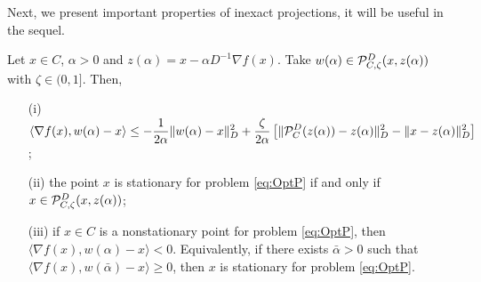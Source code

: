 Next, we present  important properties of  inexact projections,  it  will be useful in  the sequel.
\begin{lemma} \label{Le:ProjProperty}
	Let $x \in C$, $\alpha > 0$ and  $z(\alpha) = x-\alpha D^{-1} \nabla f(x)$. Take $w(\alpha) \in  {\cal P}_{C,\zeta}^{D}(x, z(\alpha))$ with $\zeta\in (0, 1]$. Then,
	\begin{itemize}
		\item[(i)] $\displaystyle \langle \nabla f(x), w(\alpha) - x\rangle \leq -\frac{1}{2\alpha} \|w(\alpha) -x\|_{D}^2 +   \frac{\zeta}{2\alpha} \left[\| {\cal P}_{C}^{D}(z(\alpha))-z(\alpha)\|_{D}^2 - \|x-z(\alpha)\|_{D}^2\right]$;
		\item[(ii)] the point $x$ is stationary for problem \eqref{eq:OptP} if and only if $x \in {\cal P}_{C,\zeta}^{D}(x, z(\alpha))$;
		\item[(iii)] if  $x \in C$ is a nonstationary point for problem \eqref{eq:OptP}, then $\Big\langle \nabla f(x), w(\alpha) - x \Big\rangle < 0$. Equivalently, if there exists ${\bar \alpha}>0$ such that $\Big\langle \nabla f(x), w({\bar \alpha}) - x \Big\rangle \geq 0$, then $x$ is stationary for problem \eqref{eq:OptP}.
	\end{itemize}
\end{lemma}
